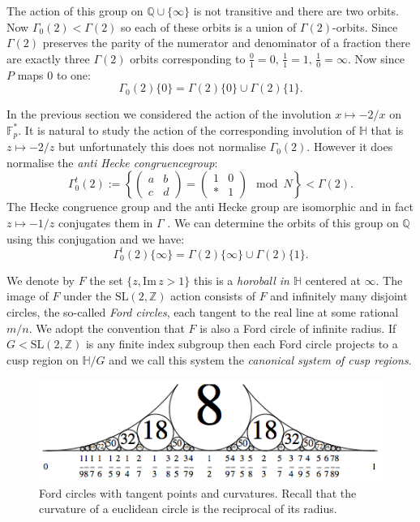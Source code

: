 \documentclass[12pt,a4paper]{amsart}
\def\HH{\mathbb{H}}
\def\im{\mathrm{Im}\,}
\def\g2{\Gamma(2)}
\def\ah{\Gamma_0^t(2)}
\def\ZZ{\mathbb{Z}}
\def\QQ{\mathbb{Q}}
\def\sl2{\mathrm{SL}(2, \ZZ)}
\begin{document}
The action of this group on $\mathbb{Q}\cup \{\infty\}$ is not
transitive and there are two orbits.
Now $\Gamma_0(2) < \Gamma(2)$ so each of these orbits is a union of
$\Gamma(2)$-orbits.
Since $\Gamma(2)$ preserves the parity of the numerator and
denominator of a fraction there are exactly three $\Gamma(2)$ orbits
corresponding to $\frac{0}{1} = 0,\, \frac{1}{1} = 1, \,
\frac{1}{0}=\infty$.
Now since $P$ maps $0$ to one:
$$\Gamma_0(2) \{0\} =   \Gamma(2) \{0\} \cup \Gamma(2) \{1\}.$$


In the previous section we considered the action of the involution
$x\mapsto -2/x$ on $\mathbb{F}_{p}^*$. It is natural to study the
action of the corresponding involution of $\mathbb{H}$ that is
$z\mapsto -2/z$ but unfortunately this does not normalise
$\Gamma_0(2)$. 
However it does normalise the \textit{anti Hecke congruencegroup}:
$$ \ah := \left \{ \begin{pmatrix} a & b \\ c & d \end{pmatrix} = 
\begin{pmatrix} 1 & 0 \\ * & 1 \end{pmatrix} \mod N \right \} < \g2.$$
The Hecke congruence group and the anti Hecke group are isomorphic
and in fact $z\mapsto -1/z$ conjugates them  in $\Gamma$  .
We can determine the orbits of this group on $\QQ$ using this
conjugation and we have:
$$\ah \{\infty\} =   \Gamma(2) \{\infty\} \cup \Gamma(2) \{1\}.$$


We denote by $F$ the set  $\{ z, \im z > 1\}$
this is a \textit{horoball in $\HH$} centered at $\infty$.
The image of $F$ under the $\sl2$ action consists of
$F$ and infinitely many disjoint circles, the so-called \textit{Ford circles}, 
each tangent to the real line at some rational $m/n$.
We adopt the convention that $F$ is also a Ford circle of infinite radius.
If $G < \sl2$ is any finite index subgroup then 
each Ford circle projects to a cusp region on $\mathbb{H}/G$ and we
call this system  the \textit{canonical system of cusp regions}.

\begin{figure}[H]
\begin{center}
\includegraphics[scale=.8]{Ford-circles.png} 
\end{center}
\caption{Ford circles with tangent points and curvatures.
Recall that the curvature of a euclidean circle is the reciprocal of its radius.}
\end{figure}
\end{document}
